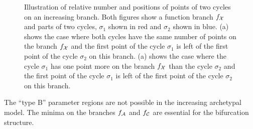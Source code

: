 \begin{figure}
	\centering
	 \quad
	\caption[Illustration of relative number and positions of points of two cycles on an increasing branch]{
		Illustration of relative number and positions of points of two cycles on an increasing branch.
		Both figures show a function branch $f_{\mathcal{X}}$ and parts of two cycles, $\sigma_1$ shown in red and $\sigma_2$ shown in blue.
		(a) shows the case where both cycles have the same number of points on the branch $f_{\mathcal{X}}$ and the first point of the cycle $\sigma_1$ is left of the first point of the cycle $\sigma_2$ on this branch.
		(a) shows the case where the cycle $\sigma_1$ has one point more on the branch $f_{\mathcal{X}}$ than the cycle $\sigma_2$ and the first point of the cycle $\sigma_1$ is left of the first point of the cycle $\sigma_2$ on this branch.
	}
	\label{fig:add.change.increasing}
\end{figure}

\begin{theorem}
	The ``type B'' parameter regions are not possible in the increasing archetypal model.
	The minima on the branches $f_{\mathcal{A}}$ and $f_{\mathcal{C}}$ are essential for the bifurcation structure.
\end{theorem}

